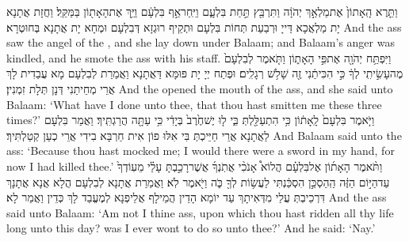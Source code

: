 {וַתֵּ֤רֶא הָֽאָתוֹן֙ אֶת\maqqaf מַלְאַ֣ךְ יְהֹוָ֔ה וַתִּרְבַּ֖ץ תַּ֣חַת בִּלְעָ֑ם וַיִּֽחַר\maqqaf אַ֣ף בִּלְעָ֔ם וַיַּ֥ךְ אֶת\maqqaf הָאָת֖וֹן בַּמַּקֵּֽל׃}
{וַחֲזָת אֲתָנָא יָת מַלְאֲכָא דַּייָ וּרְבַעַת תְּחוֹת בִּלְעָם וּתְקֵיף רוּגְזָא דְּבִלְעָם וּמְחָא יָת אֲתָנָא בְּחוּטְרָא׃}
{And the ass saw the angel of the \lord, and she lay down under Balaam; and Balaam’s anger was kindled, and he smote the ass with his staff.}{}
{וַיִּפְתַּ֥ח יְהֹוָ֖ה אֶת\maqqaf פִּ֣י הָאָת֑וֹן וַתֹּ֤אמֶר לְבִלְעָם֙ מֶה\maqqaf עָשִׂ֣יתִֽי לְךָ֔ כִּ֣י הִכִּיתַ֔נִי זֶ֖ה שָׁלֹ֥שׁ רְגָלִֽים׃}
{וּפְתַח יְיָ יָת פּוּמָּא דַּאֲתָנָא וַאֲמַרַת לְבִלְעָם מָא עֲבַדִית לָךְ אֲרֵי מְחֵיתַנִי דְּנָן תְּלָת זִמְנִין׃}
{And the \lord\space opened the mouth of the ass, and she said unto Balaam: ‘What have I done unto thee, that thou hast smitten me these three times?’}{}
{וַיֹּ֤אמֶר בִּלְעָם֙ לָֽאָת֔וֹן כִּ֥י הִתְעַלַּ֖לְתְּ בִּ֑י ל֤וּ יֶשׁ\maqqaf חֶ֙רֶב֙ בְּיָדִ֔י כִּ֥י עַתָּ֖ה הֲרַגְתִּֽיךְ׃}
{וַאֲמַר בִּלְעָם לַאֲתָנָא אֲרֵי חַיֵּיכְתְּ בִּי אִלּוּ פוֹן אִית חַרְבָּא בִידִי אֲרֵי כְעַן קְטַלְתִּיךְ׃}
{And Balaam said unto the ass: ‘Because thou hast mocked me; I would there were a sword in my hand, for now I had killed thee.’}{}
{וַתֹּ֨אמֶר הָאָת֜וֹן אֶל\maqqaf בִּלְעָ֗ם הֲלוֹא֩ אָנֹכִ֨י אֲתֹֽנְךָ֜ אֲשֶׁר\maqqaf רָכַ֣בְתָּ עָלַ֗י מֵעֽוֹדְךָ֙ עַד\maqqaf הַיּ֣וֹם הַזֶּ֔ה הַֽהַסְכֵּ֣ן הִסְכַּ֔נְתִּי לַעֲשׂ֥וֹת לְךָ֖ כֹּ֑ה וַיֹּ֖אמֶר לֹֽא׃}
{וַאֲמַרַת אֲתָנָא לְבִלְעָם הֲלָא אֲנָא אֲתָנָךְ דִּרְכֵיבְתְּ עֲלַי מִדְּאִיתָךְ עַד יוֹמָא הָדֵין הֲמֵילָף אֲלֵיפְנָא לְמֶעֱבַד לָךְ כְּדֵין וַאֲמַר לָא׃}
{And the ass said unto Balaam: ‘Am not I thine ass, upon which thou hast ridden all thy life long unto this day? was I ever wont to do so unto thee?’ And he said: ‘Nay.’}{}

